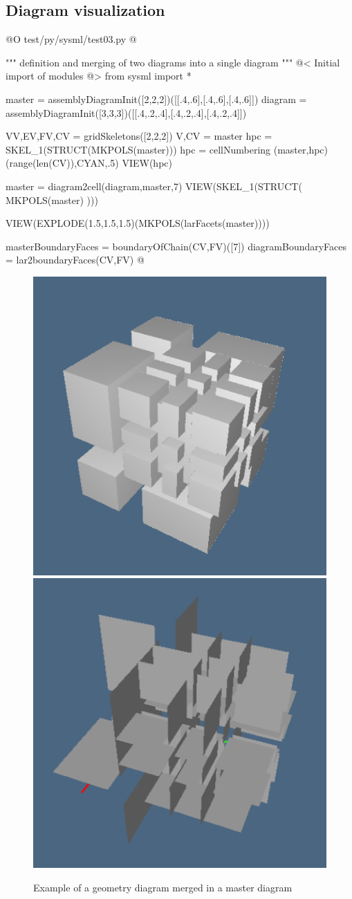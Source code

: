 \documentclass[11pt,oneside]{article}	%
\begin{document}
\subsection{Diagram visualization}


@O test/py/sysml/test03.py
@{""" definition and merging of two diagrams into a single diagram """
@< Initial import of modules @>
from sysml import *

master = assemblyDiagramInit([2,2,2])([[.4,.6],[.4,.6],[.4,.6]])
diagram = assemblyDiagramInit([3,3,3])([[.4,.2,.4],[.4,.2,.4],[.4,.2,.4]])

VV,EV,FV,CV = gridSkeletons([2,2,2])
V,CV = master
hpc = SKEL_1(STRUCT(MKPOLS(master)))
hpc = cellNumbering (master,hpc)(range(len(CV)),CYAN,.5)
VIEW(hpc)

master = diagram2cell(diagram,master,7)
VIEW(SKEL_1(STRUCT( MKPOLS(master) )))

VIEW(EXPLODE(1.5,1.5,1.5)(MKPOLS(larFacets(master))))

masterBoundaryFaces = boundaryOfChain(CV,FV)([7])
diagramBoundaryFaces = lar2boundaryFaces(CV,FV)
@}

\begin{figure}[htbp] %
   \centering
   \includegraphics[height=0.49\linewidth,width=0.49\linewidth]{images/mastermerged} 
   \includegraphics[height=0.49\linewidth,width=0.49\linewidth]{images/masterfacets} 
   \caption{Example of a geometry diagram merged in a master diagram}
   \label{fig:mastermerged}
\end{figure}
\end{document}

